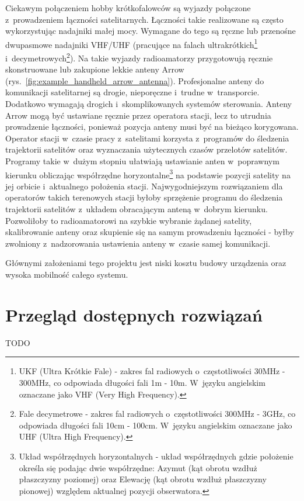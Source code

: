\documentclass[eng,oneside]{mgr}
\begin{document}
	Ciekawym połączeniem hobby krótkofalowców są wyjazdy połączone z~prowadzeniem łączności satelitarnych. Łączności takie realizowane są często wykorzystując nadajniki małej mocy. Wymagane do tego są ręczne lub przenośne dwupasmowe nadajniki VHF/UHF (pracujące na falach ultrakrótkich\footnote{UKF (Ultra Krótkie Fale) - zakres fal radiowych o~częstotliwości 30MHz - 300MHz, co odpowiada długości fali 1m - 10m. W~języku angielskim oznaczane jako VHF (Very High Frequency).} i~decymetrowych\footnote{Fale decymetrowe - zakres fal radiowych o~częstotliwości 300MHz - 3GHz, co odpowiada długości fali 10cm - 100cm. W~języku angielskim oznaczane jako UHF (Ultra High Frequency).}). Na takie wyjazdy radioamatorzy przygotowują ręcznie skonstruowane lub zakupione lekkie anteny Arrow (rys.~\ref{fig:example_handheld_arrow_antenna}). Profesjonalne anteny do komunikacji satelitarnej są drogie, nieporęczne i~trudne w~transporcie. Dodatkowo wymagają drogich i~skomplikowanych systemów sterowania. Anteny Arrow mogą być ustawiane ręcznie przez operatora stacji, lecz to utrudnia prowadzenie łączności, ponieważ pozycja anteny musi być na bieżąco korygowana. Operator stacji w~czasie pracy z~satelitami korzysta z~programów do śledzenia trajektorii satelitów oraz wyznaczania użytecznych czasów przelotów satelitów. Programy takie w~dużym stopniu ułatwiają ustawianie anten w~poprawnym kierunku obliczając współrzędne horyzontalne\footnote{Układ współrzędnych horyzontalnych - układ współrzędnych gdzie położenie określa się podając dwie współrzędne: Azymut (kąt obrotu wzdłuż płaszczyzny poziomej) oraz Elewację (kąt obrotu wzdłuż płaszczyzny pionowej) względem aktualnej pozycji obserwatora.} na podstawie pozycji satelity na jej orbicie i~aktualnego położenia stacji. Najwygodniejszym rozwiązaniem dla operatorów takich terenowych stacji byłoby sprzężenie programu do śledzenia trajektorii satelitów z~układem obracającym anteną w~dobrym kierunku. Pozwoliłoby to radioamatorowi na szybkie wybranie żądanej satelity, skalibrowanie anteny oraz skupienie się na samym prowadzeniu łączności - byłby zwolniony z~nadzorowania ustawienia anteny w~czasie samej komunikacji. 

	Głównymi założeniami tego projektu jest niski kosztu budowy urządzenia oraz wysoka mobilność całego systemu.

	\chapter{Przegląd dostępnych rozwiązań}
	\label{sec:existing_possibilities}
	TODO
	
\end{document}
